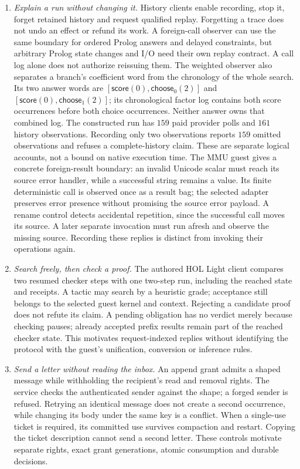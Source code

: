 \documentclass[11pt]{article}
\theoremstyle{definition}
\theoremstyle{remark}
\begin{document}
\begin{enumerate}
\item \emph{Explain a run without changing it.}
History clients enable recording, stop it, forget retained history and
request qualified replay. Forgetting a trace does not undo an effect or
refund its work. A foreign-call observer can use the same boundary for
ordered Prolog answers and delayed constraints, but arbitrary Prolog state
changes and I/O need their own replay contract. A call log alone does not
authorize reissuing them.
The weighted observer also separates a branch's coefficient word from the
chronology of the whole search. Its two answer words are
$[\mathsf{score}(0),\mathsf{choose}_0(2)]$ and
$[\mathsf{score}(0),\mathsf{choose}_1(2)]$; its chronological factor log
contains both score occurrences before both choice occurrences. Neither
answer owns that combined log. The constructed run has $159$ paid provider
polls and $161$ history observations. Recording only two observations reports
$159$ omitted observations and refuses a complete-history claim. These are
separate logical accounts, not a bound on native execution time.
The MMU guest gives a concrete foreign-result boundary: an invalid Unicode
scalar must reach its source error handler, while a successful string remains
a value. Its finite deterministic call is observed once as a result bag;
the selected adapter preserves error presence without promising the source
error payload. A rename control detects accidental repetition, since the
successful call moves its source. A later separate invocation must run
afresh and observe the missing source. Recording these replies is distinct
from invoking their operations again.

\item \emph{Search freely, then check a proof.}
The authored HOL Light client compares two resumed checker steps with one
two-step run, including the reached state and receipts. A tactic may
search by a heuristic grade; acceptance still belongs to the selected
guest kernel and context. Rejecting a candidate proof does not refute its
claim. A pending obligation has no verdict merely because checking pauses;
already accepted prefix results remain part of the reached checker state. This
motivates request-indexed replies without identifying the protocol with
the guest's unification, conversion or inference rules.

\item \emph{Send a letter without reading the inbox.}
An append grant admits a shaped message while withholding the recipient's
read and removal rights. The service checks the authenticated sender against
the shape; a forged sender is refused. Retrying an identical message does not
create a second occurrence, while changing its body under the same key is a
conflict. When a single-use ticket is required, its committed use survives
compaction and restart. Copying the ticket description cannot send a second
letter. These controls motivate separate rights, exact grant generations,
atomic consumption and durable decisions.


\end{enumerate}
\end{document}
